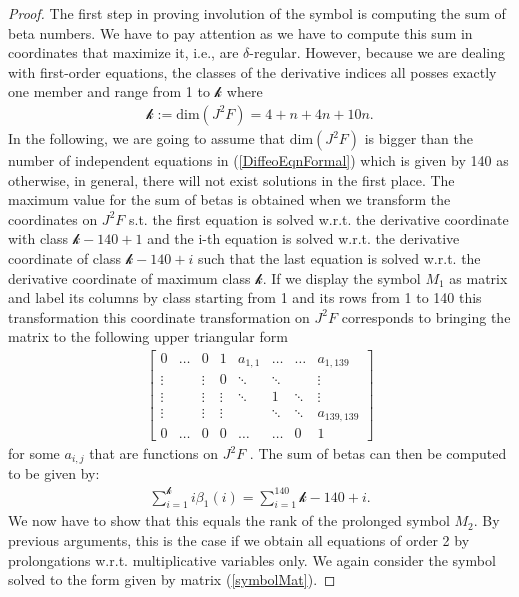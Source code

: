 \documentclass[a4paper,12pt, DIV=14, BCOR=5mm, twoside, headsepline, numbers=noenddot]{scrbook}
\begin{document}
\begin{proof}
The first step in proving involution of the symbol is computing the sum of beta numbers. We have to pay attention as we have to compute this sum in coordinates that maximize it, i.e., are $\delta$-regular. However, because we are dealing with first-order equations, the classes of the derivative indices all posses exactly one member and range from 1 to $\mathcal{k}$ where 
\begin{align}
    \mathcal{k} := \mathrm{dim}(J^2F) = 4+n+4n+10n.
\end{align}
In the following, we are going to assume that $\mathrm{dim}(J^2F)$ is bigger than the number of independent equations in (\ref{DiffeoEqnFormal}) which is given by 140 as otherwise, in general, there will not exist solutions in the first place. 
The maximum value for the sum of betas is obtained when we transform the coordinates on $J^2F$ s.t. the first equation is solved w.r.t. the derivative coordinate with class $\mathcal{k}-140+1$ and the i-th equation is solved w.r.t. the derivative coordinate of class $\mathcal{k}-140+i$ such that the last equation is solved w.r.t. the derivative coordinate of maximum class $\mathcal{k}$. If we display the symbol $M_1$ as matrix and label its columns by class starting from 1 and its rows from 1 to 140 this transformation this coordinate transformation on $J^2F$ corresponds to bringing the matrix to the following upper triangular form
\begin{align}\label{symbolMat}
\begin{bmatrix} 
      0 & \hdots & 0 & 1 & a_{1,1} & \hdots & \hdots & a_{1,139} \\
      \vdots &  & \vdots & 0 & \ddots & \ddots & & \vdots  \\
      \vdots & & \vdots & \vdots & \ddots  & 1 & \ddots & \vdots  \\
      \vdots & & \vdots & \vdots & & \ddots & \ddots & a_{139,139} \\
      0 & \hdots & 0 & 0 & \hdots  & \hdots & 0 & 1
\end{bmatrix}
\end{align}
for some $a_{i,j}$ that are functions on $J^2F$ . The sum of betas can then be computed to be given by:
\begin{align}
    \sum_{i=1}^{\mathcal{k}} i \beta_1(i) = \sum_{i = 1}^{140} \mathcal{k} -140+i.
\end{align}
We now have to show that this equals the rank of the prolonged symbol $M_2$. By previous arguments, this is the case if we obtain all equations of order 2 by prolongations w.r.t. multiplicative variables only. We again consider the symbol solved to the form given by matrix (\ref{symbolMat}). 

\end{proof}
\end{document}
